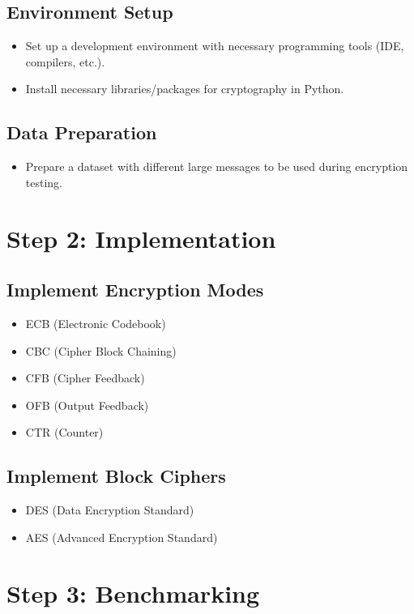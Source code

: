 \documentclass{exam}
\begin{document}
  \subsection*{Environment Setup}
  \begin{itemize}
      \item Set up a development environment with necessary programming tools (IDE, compilers, etc.).
      \item Install necessary libraries/packages for cryptography in Python.
  \end{itemize}

  \subsection*{Data Preparation}
  \begin{itemize}
      \item Prepare a dataset with different large messages to be used during encryption testing.
  \end{itemize}

  \section*{Step 2: Implementation}

  \subsection*{Implement Encryption Modes}
  \begin{itemize}
      \item ECB (Electronic Codebook)
      \item CBC (Cipher Block Chaining)
      \item CFB (Cipher Feedback)
      \item OFB (Output Feedback)
      \item CTR (Counter)
  \end{itemize}

  \subsection*{Implement Block Ciphers}
  \begin{itemize}
      \item DES (Data Encryption Standard)
      \item AES (Advanced Encryption Standard)
  \end{itemize}

  \section*{Step 3: Benchmarking}
\end{document}

